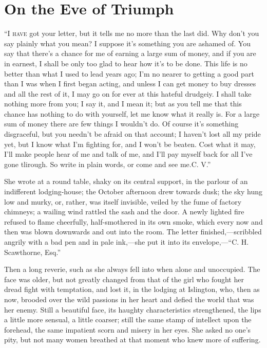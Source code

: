 \chapter{On the Eve of Triumph}

\textsc{``I have} got your letter, but it tells me no more than the last
did. Why don't you say plainly what you mean? I suppose it's something
you are ashamed of. You say that there's a chance for me of earning a
large sum of money, and if you are in earnest, I shall be only too glad
to hear how it's to be done. This life is no better than what I used to
lead years ago; I'm no nearer to getting a good part than I was when I
first began acting, and unless I can get money to buy dresses and all
the rest of it, I may go on for ever at this hateful drudgeiy. I shall
take nothing more from you; I say it, and I mean it; but as you tell me
that this chance has nothing to do with yourself, let me know what it
really is. For a large sum of money {\protect\hypertarget{196}{}{}}there
are few things I wouldn't do. Of course it's something disgraceful, but
you needn't be afraid on that account; I haven't lost all my pride yet,
but I know what I'm fighting for, and I won't be beaten. Cost what it
may, I'll make people hear of me and talk of me, and I'll pay myself
back for all I've gone tlirough. So write in plain words, or come and
see me.{C. V.''}

She wrote at a round table, shaky on its central support, in the parlour
of an indifferent lodging-house; the October afternoon drew towards
dusk; the sky hung low and murky, or, rather, was itself invisible,
veiled by the fume of factory chimneys; a wailing wind rattled the sash
and the door. A newly lighted fire refused to flame cheerfully,
half-smothered in its own smoke, which every now and then was blown
downwards and out into the room. The letter finished,---scribbled
angrily with a bad pen and in pale ink,---she put it into its
envelope,---``C. H. Scawthorne, Esq.''

{\protect\hypertarget{197}{}{}}Then a long reverie, such as she always
fell into when alone and unoccupied. The face was older, but not greatly
changed from that of the girl who fought her dread fight with
temptation, and lost it, in the lodging at Islington, who, then as now,
brooded over the wild passions in her heart and defied the world that
was her enemy. Still a beautiful face, its haughty characteristics
strengthened, the lips a little more sensual, a little coarser; still
the same stamp of intellect upon the forehead, the same impatient scorn
and misery in her eyes. She asked no one's pity, but not many women
breathed at that moment who knew more of suffering.

